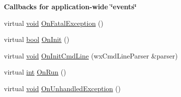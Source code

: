 \begin{Indent}{\bf Callbacks for application-\/wide \char`\"{}events\char`\"{}}
\begin{DoxyCompactItemize}
\item 
virtual \hyperlink{sound_8c_ae35f5844602719cf66324f4de2a658b3}{void} \hyperlink{classwx_app_console_a927931aafbb7aec4debdfc02ee6f6f9d}{On\+Fatal\+Exception} ()
\item 
virtual \hyperlink{mac_2config_2i386_2lib-src_2libsoxr_2soxr-config_8h_abb452686968e48b67397da5f97445f5b}{bool} \hyperlink{classwx_app_console_a99953775a2fd83fa2456e390779afe15}{On\+Init} ()
\item 
virtual \hyperlink{sound_8c_ae35f5844602719cf66324f4de2a658b3}{void} \hyperlink{classwx_app_console_a1708aeb916cbc3dc4a3333f1a6f33e04}{On\+Init\+Cmd\+Line} (wx\+Cmd\+Line\+Parser \&parser)
\item 
virtual \hyperlink{xmltok_8h_a5a0d4a5641ce434f1d23533f2b2e6653}{int} \hyperlink{classwx_app_console_ac05a28c7cdb529f2cdfe77b3431c385c}{On\+Run} ()
\item 
virtual \hyperlink{sound_8c_ae35f5844602719cf66324f4de2a658b3}{void} \hyperlink{classwx_app_console_a8c241ae1aa045da4470664813b7ec960}{On\+Unhandled\+Exception} ()
\end{DoxyCompactItemize}
\end{Indent}

